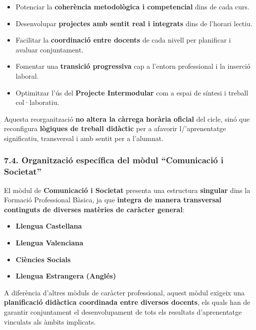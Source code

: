 \documentclass[
  paper=a4,
  ,captions=tableheading
]{scrartcl}
\providecommand{\tightlist}{%
  \setlength{\itemsep}{0pt}\setlength{\parskip}{0pt}}
\begin{document}
\begin{itemize}
\tightlist
\item
  Potenciar la \textbf{coherència metodològica i competencial} dins de
  cada curs.
\item
  Desenvolupar \textbf{projectes amb sentit real i integrats} dins de
  l'horari lectiu.
\item
  Facilitar la \textbf{coordinació entre docents} de cada nivell per
  planificar i avaluar conjuntament.
\item
  Fomentar una \textbf{transició progressiva} cap a l'entorn
  professional i la inserció laboral.
\item
  Optimitzar l'ús del \textbf{Projecte Intermodular} com a espai de
  síntesi i treball col·laboratiu.
\end{itemize}

Aquesta reorganització \textbf{no altera la càrrega horària oficial} del
cicle, sinó que reconfigura \textbf{lògiques de treball didàctic} per a
afavorir l/'aprenentatge significatiu, transversal i amb sentit per a
l'alumnat.

\hypertarget{organitzaciuxf3-especuxedfica-del-muxf2dul-comunicaciuxf3-i-societat}{%
\subsubsection{7.4. Organització específica del mòdul ``Comunicació i
Societat''}\label{organitzaciuxf3-especuxedfica-del-muxf2dul-comunicaciuxf3-i-societat}}

El mòdul de \textbf{Comunicació i Societat} presenta una estructura
\textbf{singular} dins la Formació Professional Bàsica, ja que
\textbf{integra de manera transversal continguts de diverses matèries de
caràcter general}:

\begin{itemize}
\tightlist
\item
  \textbf{Llengua Castellana}
\item
  \textbf{Llengua Valenciana}
\item
  \textbf{Ciències Socials}
\item
  \textbf{Llengua Estrangera (Anglés)}
\end{itemize}

A diferència d'altres mòduls de caràcter professional, aquest mòdul
exigeix una \textbf{planificació didàctica coordinada entre diversos
docents}, els quals han de garantir conjuntament el desenvolupament de
tots els resultats d'aprenentatge vinculats als àmbits implicats.
\end{document}
